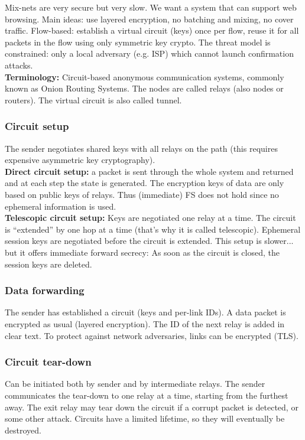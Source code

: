 \documentclass[11pt,oneside,a4paper]{article}
\begin{document}
Mix-nets are very secure but very slow. We want a system that can support web browsing. Main ideas: use layered encryption, no batching and mixing, no cover traffic. Flow-based: establish a virtual circuit (keys) once per flow, reuse it for all packets in the flow using only symmetric key crypto. The threat model is constrained: only a local adversary (e.g. ISP) which cannot launch confirmation attacks.\\
\indent \textbf{Terminology:} Circuit-based anonymous communication systems, commonly known as Onion Routing Systems. The nodes are called relays (also nodes or routers). The virtual circuit is also called tunnel.

\subsubsection{Circuit setup}

The sender negotiates shared keys with all relays on the path (this requires expensive asymmetric key cryptography).\\
\noindent \textbf{Direct circuit setup:} a packet is sent through the whole system and returned and at each step the state is generated. The encryption keys of data are only based on public keys of relays. Thus (immediate) FS does not hold since no ephemeral information is used.\\
\noindent \textbf{Telescopic circuit setup:} Keys are negotiated one relay at a time. The circuit is “extended” by one hop at a time (that’s why it is called telescopic). Ephemeral session keys are negotiated before the circuit is extended. This setup is slower... but it offers immediate forward secrecy: As soon as the circuit is closed, the session keys are deleted.

\subsubsection{Data forwarding}

The sender has established a circuit (keys and per-link IDs). A data packet is encrypted as usual (layered encryption). The ID of the next relay is added in clear text. To protect against network adversaries, links can be encrypted (TLS).

\subsubsection{Circuit tear-down}

Can be initiated both by sender and by intermediate relays. The sender communicates the tear-down to one relay at a time, starting from the furthest away. The exit relay may tear down the circuit if a corrupt packet is detected, or some other attack. Circuits have a limited lifetime, so they will eventually be destroyed.
\end{document}
